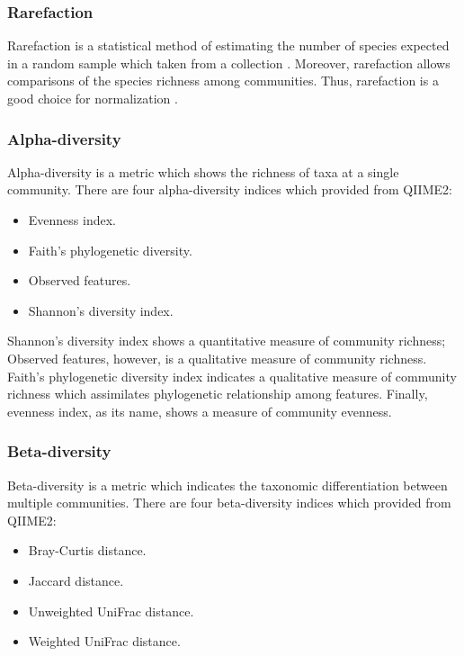 \documentclass[a4paper]{article}
\begin{document}
            \subsubsection{Rarefaction}
                Rarefaction is a statistical method of estimating the number of species expected in a random sample which taken from a collection \cite{rarefaction1}. Moreover, rarefaction allows comparisons of the species richness among communities. Thus, rarefaction is a good choice for normalization \cite{rarefaction2}.

            \subsubsection{Alpha-diversity}
                Alpha-diversity is a metric which shows the richness of taxa at a single community. There are four alpha-diversity indices which provided from QIIME2:
                \begin{itemize}
                    \item Evenness index.
                    \item Faith's phylogenetic diversity.
                    \item Observed features.
                    \item Shannon's diversity index.
                \end{itemize}

                Shannon's diversity index shows a quantitative measure of community richness; Observed features, however, is a qualitative measure of community richness. Faith's phylogenetic diversity index indicates a qualitative measure of community richness which assimilates phylogenetic relationship among features. Finally, evenness index, as its name, shows a measure of community evenness.

            \subsubsection{Beta-diversity}
                Beta-diversity is a metric which indicates the taxonomic differentiation between multiple communities. There are four beta-diversity indices which provided from QIIME2:
                \begin{itemize}
                    \item Bray-Curtis distance.
                    \item Jaccard distance.
                    \item Unweighted UniFrac distance.
                    \item Weighted UniFrac distance.
                \end{itemize}
\end{document}
